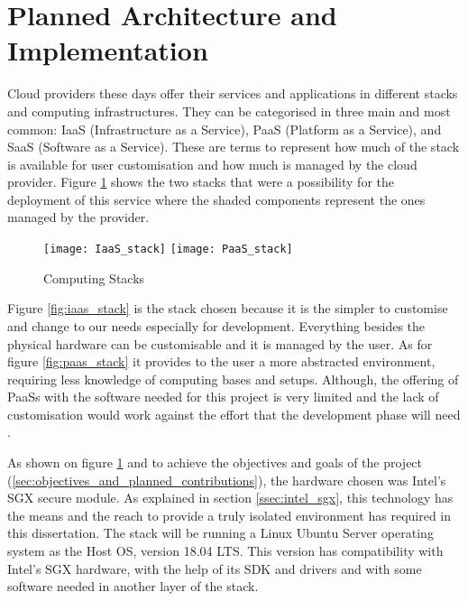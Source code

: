\section{Planned Architecture and Implementation} %
\label{sec:planned_architecture_and_implementation}

Cloud providers these days offer their services and applications in different stacks and computing infrastructures. They can be categorised in three main and most common: \gls{IaaS} (Infrastructure as a Service), \gls{PaaS} (Platform as a Service), and \gls{SaaS} (Software as a Service). These are terms to represent how much of the stack is available for user customisation and how much is managed by the cloud provider. Figure \ref{fig:computing_stacks} shows the two stacks that were a possibility for the deployment of this service where the shaded components represent the ones managed by the provider.

\begin{figure}[htbp]
  \centering
    {\texttt{[image: IaaS\_stack]}}%
    \hspace{5em}
    {\texttt{[image: PaaS\_stack]}}%
  \caption{Computing Stacks}
  \label{fig:computing_stacks}
\end{figure}

Figure \ref{fig:iaas_stack} is the stack chosen because it is the simpler to customise and change to our needs especially for development. Everything besides the physical hardware can be customisable and it is managed by the user. As for figure \ref{fig:paas_stack} it provides to the user a more abstracted environment, requiring less knowledge of computing bases and setups. Although, the offering of \glspl{PaaS} with the software needed for this project is very limited and the lack of customisation would work against the effort that the development phase will need \cite{computing_stacks:1}.

As shown on figure \ref{fig:computing_stacks} and to achieve the objectives and goals of the project (\ref{sec:objectives_and_planned_contributions}), the hardware chosen was Intel's \gls{SGX} secure module. As explained in section \ref{ssec:intel_sgx}, this technology has the means and the reach to provide a truly isolated environment has required in this dissertation. The stack will be running a Linux Ubuntu Server \cite{ubuntu_server:1} operating system as the Host \gls{OS}, version 18.04 LTS. This version has compatibility with Intel's \gls{SGX} hardware, with the help of its \gls{SDK} and drivers \cite{sgx_sdk:1, sgx_drivers:1} and with some software needed in another layer of the stack.


